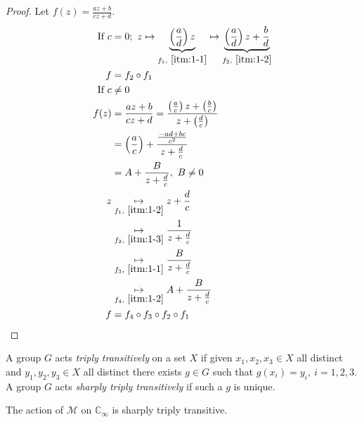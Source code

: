 \begin{proof}
    Let $f(z) = \frac{az + b}{cz + d}$. \\
    \begin{align*}
        \text{If } c&= 0;\ z \mapsto \underbrace{\left(\frac{a}{d} \right) z}_{f_1,\ \Cref{itm:1-1}} \mapsto \underbrace{\left( \frac{a}{d} \right) z + \frac{b}{d}}_{f_2,\ \Cref{itm:1-2}} \\
        f &= f_2 \circ f_1 \\
        \text{If } c &\neq 0 \\
        f(z) &= \frac{az + b}{cz + d} = \frac{\left( \frac{a}{c} \right) z + \left( \frac{b}{c} \right)}{z + \left( \frac{d}{c} \right)} \\
        &= \left( \frac{a}{c} \right) + \frac{\frac{-ad + bc}{c^2}}{z + \frac{d}{c}} \\
        &= A + \frac{B}{z + \frac{d}{c}},\ B \neq 0 \\
        z &\underset{f_1,\ \Cref{itm:1-2}}{\mapsto} z + \frac{d}{c} \\
        &\underset{f_2,\ \Cref{itm:1-3}}{\mapsto} \frac{1}{z + \frac{d}{c}} \\
        &\underset{f_3,\ \Cref{itm:1-1}}{\mapsto} \frac{B}{z + \frac{d}{c}} \\
        &\underset{f_4,\ \Cref{itm:1-2}}{\mapsto} A + \frac{B}{z + \frac{d}{c}} \\
        f &= f_4 \circ f_3 \circ f_2 \circ f_1
    \end{align*} 
\end{proof} 

\begin{definition} \label{def:22}
    A group $G$ acts \emph{triply transitively} on a set $X$ if given $x_1, x_2, x_3 \in X$ all distinct and $y_1, y_2, y_3 \in X$ all distinct there exists $g \in G$ such that $g(x_i) = y_i,\ i = 1, 2, 3$. \\
    A group $G$ acts \emph{sharply triply transitively} if such a $g$ is unique.
\end{definition} 

\begin{theorem} \label{thm:16}
    The action of $\mathcal{M}$ on $\mathbb{C}_\infty$ is sharply triply transitive.
\end{theorem} 

